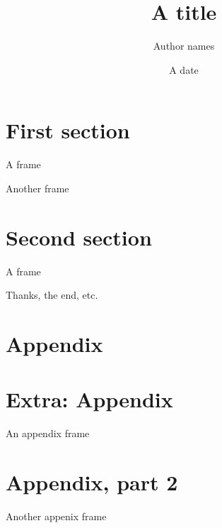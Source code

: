 \documentclass[aspectratio=169]{beamer}
\title[Some title]{A title}
\author{Author names}
\date{A date}
\begin{document}
\bgroup{}%
\addtocounter{framenumber}{-1}
\begin{frame}
\titlepage %
\end{frame}\egroup

\section{First section}

\begin{frame}{A frame}
    
\end{frame}

\begin{frame}{Another frame}
    
\end{frame}

\section{Second section}

\begin{frame}{A frame}
    
\end{frame}

\begin{frame}
    \begin{center}
        \huge Thanks, the end, etc.
    \end{center}
\end{frame}

\AtBeginSection[]{}
\section{Appendix}

\appendix

\section{Extra: Appendix}

\begin{frame}{An appendix frame}
    
\end{frame}

\section{Appendix, part 2}

\begin{frame}{Another appenix frame}
    
\end{frame}
\end{document}
